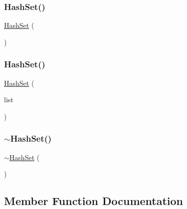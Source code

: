 \subsubsection{\texorpdfstring{Hash\+Set()}{HashSet()}\hspace{0.1cm}{\footnotesize\ttfamily [1/2]}}
{\footnotesize\ttfamily \mbox{\hyperlink{classHashSet}{Hash\+Set}} (\begin{DoxyParamCaption}{ }\end{DoxyParamCaption})}

\mbox{\label{classHashSet_a465424553c693215f7bd49a3459ff446}} 
\subsubsection{\texorpdfstring{Hash\+Set()}{HashSet()}\hspace{0.1cm}{\footnotesize\ttfamily [2/2]}}
{\footnotesize\ttfamily \mbox{\hyperlink{classHashSet}{Hash\+Set}} (\begin{DoxyParamCaption}\item[{std\+::initializer\+\_\+list$<$ Value\+Type $>$}]{list }\end{DoxyParamCaption})}

\mbox{\label{classHashSet_ac92d8361caa78dd6d9e4fe122df697ad}} 
\subsubsection{\texorpdfstring{$\sim$\+Hash\+Set()}{~HashSet()}}
{\footnotesize\ttfamily $\sim$\mbox{\hyperlink{classHashSet}{Hash\+Set}} (\begin{DoxyParamCaption}{ }\end{DoxyParamCaption})\hspace{0.3cm}{\ttfamily [virtual]}}



\subsection{Member Function Documentation}
\mbox{\label{classHashSet_ab901606bf3a8019c986f0cf9a9f298dc}} 
